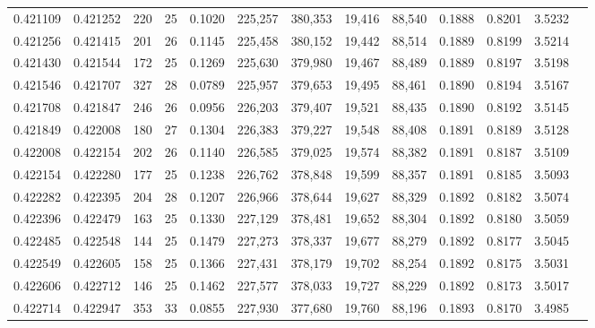 \begin{tabular}{rrrrrrrrrrrrr}
0.421109 & 0.421252 & 220 &  25 &                                     0.1020 & 225,257 & 380,353 &  19,416 &  88,540 & 0.1888 & 0.8201 & 3.5232 \\
0.421256 & 0.421415 & 201 &  26 &                                     0.1145 & 225,458 & 380,152 &  19,442 &  88,514 & 0.1889 & 0.8199 & 3.5214 \\
0.421430 & 0.421544 & 172 &  25 &                                     0.1269 & 225,630 & 379,980 &  19,467 &  88,489 & 0.1889 & 0.8197 & 3.5198 \\
0.421546 & 0.421707 & 327 &  28 &                                     0.0789 & 225,957 & 379,653 &  19,495 &  88,461 & 0.1890 & 0.8194 & 3.5167 \\
0.421708 & 0.421847 & 246 &  26 &                                     0.0956 & 226,203 & 379,407 &  19,521 &  88,435 & 0.1890 & 0.8192 & 3.5145 \\
0.421849 & 0.422008 & 180 &  27 &                                     0.1304 & 226,383 & 379,227 &  19,548 &  88,408 & 0.1891 & 0.8189 & 3.5128 \\
0.422008 & 0.422154 & 202 &  26 &                                     0.1140 & 226,585 & 379,025 &  19,574 &  88,382 & 0.1891 & 0.8187 & 3.5109 \\
0.422154 & 0.422280 & 177 &  25 &                                     0.1238 & 226,762 & 378,848 &  19,599 &  88,357 & 0.1891 & 0.8185 & 3.5093 \\
0.422282 & 0.422395 & 204 &  28 &                                     0.1207 & 226,966 & 378,644 &  19,627 &  88,329 & 0.1892 & 0.8182 & 3.5074 \\
0.422396 & 0.422479 & 163 &  25 &                                     0.1330 & 227,129 & 378,481 &  19,652 &  88,304 & 0.1892 & 0.8180 & 3.5059 \\
0.422485 & 0.422548 & 144 &  25 &                                     0.1479 & 227,273 & 378,337 &  19,677 &  88,279 & 0.1892 & 0.8177 & 3.5045 \\
0.422549 & 0.422605 & 158 &  25 &                                     0.1366 & 227,431 & 378,179 &  19,702 &  88,254 & 0.1892 & 0.8175 & 3.5031 \\
0.422606 & 0.422712 & 146 &  25 &                                     0.1462 & 227,577 & 378,033 &  19,727 &  88,229 & 0.1892 & 0.8173 & 3.5017 \\
0.422714 & 0.422947 & 353 &  33 &                                     0.0855 & 227,930 & 377,680 &  19,760 &  88,196 & 0.1893 & 0.8170 & 3.4985 \\

\end{tabular}
